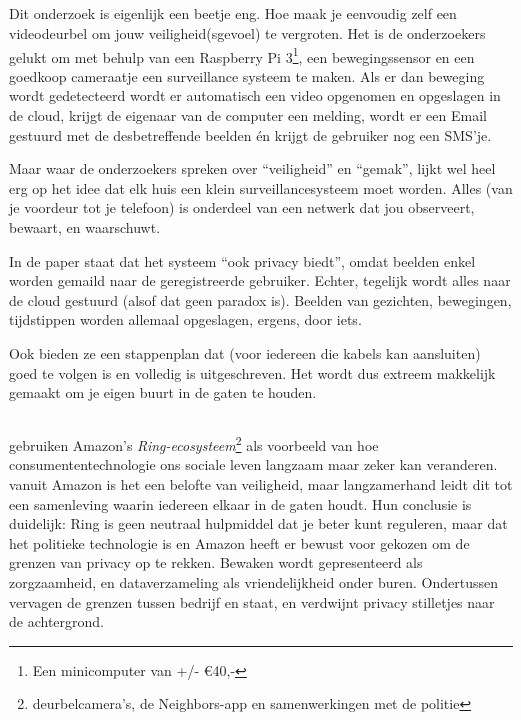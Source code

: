 \documentclass[nonacm,sigconf]{acmart}
\begin{document}
    \subsection{}

    \parencite{lalitha2019smart} Dit onderzoek is eigenlijk een beetje eng.
    Hoe maak je eenvoudig zelf een videodeurbel om jouw veiligheid(sgevoel) te vergroten.
    Het is de onderzoekers gelukt om met behulp van een Raspberry Pi 3\footnote{Een minicomputer van +/- €40,-}, een bewegingssensor en een goedkoop cameraatje een surveillance systeem te maken.
    Als er dan beweging wordt gedetecteerd wordt er automatisch een video opgenomen en opgeslagen in de cloud, krijgt de eigenaar van de computer een melding, wordt er een Email gestuurd met de desbetreffende beelden én krijgt de gebruiker nog een SMS'je.

    Maar waar de onderzoekers spreken over “veiligheid” en “gemak”, lijkt wel heel erg op het idee dat elk huis een klein surveillancesysteem moet worden.
    Alles (van je voordeur tot je telefoon) is onderdeel van een netwerk dat jou observeert, bewaart, en waarschuwt.

    In de paper staat dat het systeem “ook privacy biedt”, omdat beelden enkel worden gemaild naar de geregistreerde gebruiker.
    Echter, tegelijk wordt alles naar de cloud gestuurd (alsof dat geen paradox is).
    Beelden van gezichten, bewegingen, tijdstippen worden allemaal opgeslagen, ergens, door iets.

    Ook bieden ze een stappenplan dat (voor iedereen die kabels kan aansluiten) goed te volgen is en volledig is uitgeschreven.
    Het wordt dus extreem makkelijk gemaakt om je eigen buurt in de gaten te houden.

    \subsection{}

    \parencite{selinger2022amazon} gebruiken Amazon’s \textit{Ring-ecosysteem}\footnote{deurbelcamera’s, de Neighbors-app en samenwerkingen met de politie} als voorbeeld van hoe consumententechnologie ons sociale leven langzaam maar zeker kan veranderen.
    vanuit Amazon is het een belofte van veiligheid, maar langzamerhand leidt dit tot een samenleving waarin iedereen elkaar in de gaten houdt.
    Hun conclusie is duidelijk: Ring is geen neutraal hulpmiddel dat je beter kunt reguleren, maar dat het politieke technologie is en Amazon heeft er bewust voor gekozen om de grenzen van privacy op te rekken.
    Bewaken wordt gepresenteerd als zorgzaamheid, en dataverzameling als vriendelijkheid onder buren.
    Ondertussen vervagen de grenzen tussen bedrijf en staat, en verdwijnt privacy stilletjes naar de achtergrond.
\end{document}
